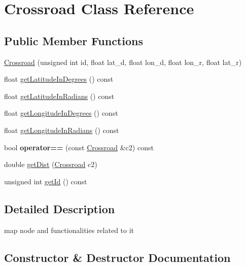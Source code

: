 \hypertarget{class_crossroad}{}\section{Crossroad Class Reference}
\label{class_crossroad}
\subsection*{Public Member Functions}
\begin{DoxyCompactItemize}
\item 
\hyperlink{class_crossroad_ad382cd4797d691a388f5dae7ad2aa7e1}{Crossroad} (unsigned int id, float lat\+\_\+d, float lon\+\_\+d, float lon\+\_\+r, float lat\+\_\+r)
\item 
float \hyperlink{class_crossroad_a089ec6f57ec1535c5382aa970542f0a7}{get\+Latitude\+In\+Degrees} () const 
\item 
float \hyperlink{class_crossroad_a9dfa221519cd05a3562ebab44df7cedc}{get\+Latitude\+In\+Radians} () const 
\item 
float \hyperlink{class_crossroad_aaf1bace7c2be7fcf009e3b3e05de87c7}{get\+Longitude\+In\+Degrees} () const 
\item 
float \hyperlink{class_crossroad_afeb5ebed1f9df93e54a5e3f1395fc980}{get\+Longitude\+In\+Radians} () const 
\item 
\hypertarget{class_crossroad_abd6140071d0b179dc1dd54fa7ce03768}{}bool {\bfseries operator==} (const \hyperlink{class_crossroad}{Crossroad} \&c2) const \label{class_crossroad_abd6140071d0b179dc1dd54fa7ce03768}

\item 
double \hyperlink{class_crossroad_ae118c0ada6b191335a6e0f0fdce1e0d5}{get\+Dist} (\hyperlink{class_crossroad}{Crossroad} c2)
\item 
unsigned int \hyperlink{class_crossroad_a81e112365e77a43a729fd807538bd339}{get\+Id} () const 
\end{DoxyCompactItemize}


\subsection{Detailed Description}
map node and functionalities related to it 

\subsection{Constructor \& Destructor Documentation}
\hypertarget{class_crossroad_ad382cd4797d691a388f5dae7ad2aa7e1}{}
